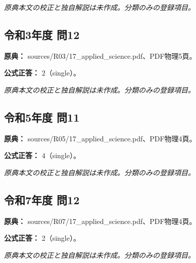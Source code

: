 \par\textit{原典本文の校正と独自解説は未作成。分類のみの登録項目。}

\subsection{令和3年度 問12}
\label{q:r03-reg-applied-12}

\noindent\textbf{原典：} sources/R03/17\_applied\_science.pdf、PDF物理5頁。

\textbf{公式正答：} 2（single）。

\par\textit{原典本文の校正と独自解説は未作成。分類のみの登録項目。}

\subsection{令和5年度 問11}
\label{q:r05-reg-applied-11}

\noindent\textbf{原典：} sources/R05/17\_applied\_science.pdf、PDF物理4頁。

\textbf{公式正答：} 4（single）。

\par\textit{原典本文の校正と独自解説は未作成。分類のみの登録項目。}

\subsection{令和7年度 問12}
\label{q:r07-reg-applied-12}

\noindent\textbf{原典：} sources/R07/17\_applied\_science.pdf、PDF物理4頁。

\textbf{公式正答：} 2（single）。

\par\textit{原典本文の校正と独自解説は未作成。分類のみの登録項目。}
